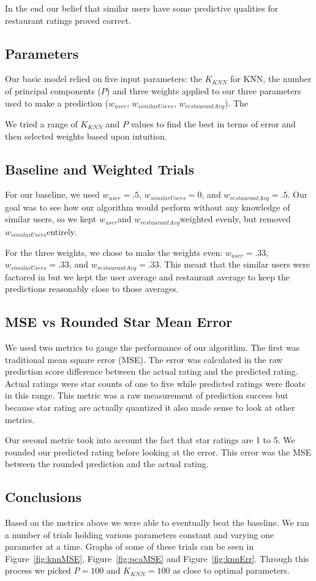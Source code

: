 \documentclass[10pt,twocolumn,letterpaper]{article}
\newcommand{\wu}{\ensuremath{w_{user}}}
\newcommand{\ws}{\ensuremath{w_{similarUsers}}}
\newcommand{\wrst}{\ensuremath{w_{restaurantAvg}}}
\begin{document}
In the end our belief that similar users have some predictive qualities for restaurant ratings proved correct.

\subsection{Parameters}
Our basic model relied on five input parameters: the $K_{KNN}$ for KNN, the number of principal components ($P$) and three weights applied to our three parameters used to make a prediction (\wu, \ws, \wrst). The 

We tried a range of $K_{KNN}$ and $P$ values to find the best in terms of error and then selected weights based upon intuition.

\subsection{Baseline and Weighted Trials}

For our baseline, we used $\wu=.5$, $\ws=0$, and $\wrst=.5$. Our goal was to see how our algorithm would perform without any knowledge of similar users, so we kept \wu and \wrst weighted evenly, but removed \ws entirely.

For the three weights, we chose to make the weights even: $\wu=.33$, $\ws=.33$, and $\wrst=.33$. This meant that the similar users were factored in but we kept the user average and restaurant average to keep the predictions reasonably close to those averages.

\subsection{MSE vs Rounded Star Mean Error}
We used two metrics to gauge the performance of our algorithm. The first was traditional mean square error (MSE). The error was calculated in the raw prediction score difference between the actual rating and the predicted rating. Actual ratings were star counts of one to five while predicted ratings were floats in this range. This metric was a raw measurement of prediction success but because star rating are actually quantized it also made sense to look at other metrics.

Our second metric took into account the fact that star ratings are 1 to 5. We rounded our predicted rating before looking at the error. This error was the MSE between the rounded prediction and the actual rating.

\subsection{Conclusions}
Based on the metrics above we were able to eventually beat the baseline. We ran a number of trials holding various parameters constant and varying one parameter at a time. Graphs of some of these trials can be seen in Figure~\ref{fig:knnMSE}, Figure~\ref{fig:pcaMSE} and Figure~\ref{fig:knnErr}. Through this process we picked $P=100$ and $K_{KNN}=100$ as close to optimal parameters.
\end{document}
